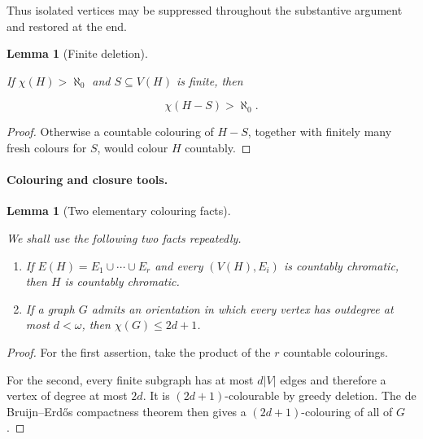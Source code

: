 \documentclass[a4paper,11pt,reqno]{amsart}
\providecommand{\tightlist}{\setlength{\itemsep}{0pt}\setlength{\parskip}{0pt}}
\theoremstyle{plain}
\newtheorem{lemma}[theorem]{Lemma}
\theoremstyle{definition}
\theoremstyle{remark}
\begin{document}
Thus isolated vertices may be suppressed throughout the substantive argument and restored at the end.

\begin{lemma}[Finite deletion]\label{lemma-1.2-finite-deletion}

If \(\chi(H)>\aleph_0\) and \(S\subseteq V(H)\) is finite, then

\[
\chi(H-S)>\aleph_0.
\]

\end{lemma}
\begin{proof}
Otherwise a countable colouring of \(H-S\), together with finitely many fresh colours for \(S\), would colour \(H\) countably.
\end{proof}

\paragraph{Colouring and closure tools.}\label{colouring-and-closure-tools}

\begin{lemma}[Two elementary colouring facts]\label{lemma-1.3-two-elementary-colouring-facts}

We shall use the following two facts repeatedly.

\begin{enumerate}
\def\labelenumi{\arabic{enumi}.}
\tightlist
\item
  If \(E(H)=E_1\cup\cdots\cup E_r\) and every \((V(H),E_i)\) is countably chromatic, then \(H\) is countably chromatic.
\item
  If a graph \(G\) admits an orientation in which every vertex has outdegree at most \(d<\omega\), then \(\chi(G)\le 2d+1\).
\end{enumerate}

\end{lemma}
\begin{proof}
For the first assertion, take the product of the \(r\) countable colourings.

For the second, every finite subgraph has at most \(d|V|\) edges and therefore a vertex of degree at most \(2d\). It is \((2d+1)\)-colourable by greedy deletion. The de Bruijn--Erdős compactness theorem \citep[Theorem~1]{debruijn1951} then gives a \((2d+1)\)-colouring of all of \(G\).
\end{proof}
\end{document}
